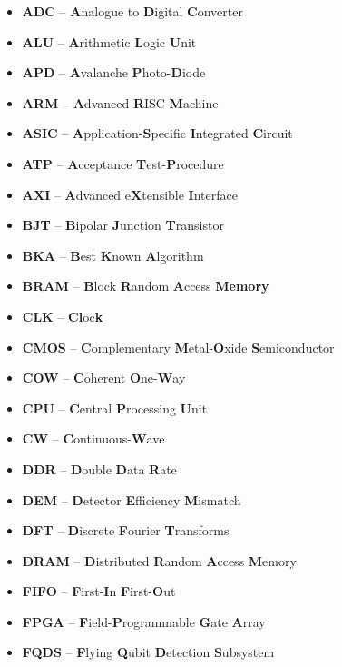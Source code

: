 \begin{itemize}
\item {\bf ADC}		-- \textbf{A}nalogue to \textbf{D}igital \textbf{C}onverter
\item {\bf ALU}	    -- \textbf{A}rithmetic \textbf{L}ogic \textbf{U}nit
\item {\bf APD}	    -- \textbf{A}valanche \textbf{P}hoto-\textbf{D}iode
\item {\bf ARM}	    -- \textbf{A}dvanced \textbf{R}ISC \textbf{M}achine
\item {\bf ASIC}    -- \textbf{A}pplication-\textbf{S}pecific \textbf{I}ntegrated \textbf{C}ircuit
\item {\bf ATP}	    -- \textbf{A}cceptance \textbf{T}est-\textbf{P}rocedure
\item {\bf AXI}    	-- \textbf{A}dvanced e\textbf{X}tensible \textbf{I}nterface
\item {\bf BJT}	    -- \textbf{B}ipolar \textbf{J}unction \textbf{T}ransistor
\item {\bf BKA}	    -- \textbf{B}est \textbf{K}nown \textbf{A}lgorithm
\item {\bf BRAM}	-- \textbf{B}lock \textbf{R}andom \textbf{A}ccess \textbf{Memory}
\item {\bf CLK}	    -- \textbf{Cl}oc\textbf{k}
\item {\bf CMOS}	-- \textbf{C}omplementary \textbf{M}etal-\textbf{O}xide \textbf{S}emiconductor
\item {\bf COW}		-- \textbf{C}oherent \textbf{O}ne-\textbf{W}ay
\item {\bf CPU}	    -- \textbf{C}entral \textbf{P}rocessing \textbf{U}nit
\item {\bf CW}	    -- \textbf{C}ontinuous-\textbf{W}ave
\item {\bf DDR}		-- \textbf{D}ouble \textbf{D}ata \textbf{R}ate
\item {\bf DEM}	    -- \textbf{D}etector \textbf{E}fficiency \textbf{M}ismatch 
\item {\bf DFT}	    -- \textbf{D}iscrete \textbf{F}ourier \textbf{T}ransforms 
\item {\bf DRAM}	-- \textbf{D}istributed \textbf{R}andom \textbf{A}ccess \textbf{M}emory
\item {\bf FIFO}	-- \textbf{F}irst-\textbf{I}n \textbf{F}irst-\textbf{O}ut
\item {\bf FPGA}	-- \textbf{F}ield-\textbf{P}rogrammable \textbf{G}ate \textbf{A}rray
\item {\bf FQDS}    -- \textbf{F}lying \textbf{Q}ubit \textbf{D}etection \textbf{S}ubsystem

\end{itemize}
